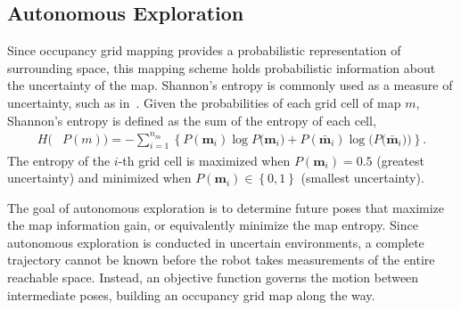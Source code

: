 \documentclass[smallextended]{svjour3}       %
\newcommand{\braces}[1]{\ensuremath{\left\{ #1 \right\}}}
\begin{document}
\subsection{Autonomous Exploration}
\label{subsec:AE}
Since occupancy grid mapping provides a probabilistic representation of surrounding space, this mapping scheme holds probabilistic information about the uncertainty of the map. Shannon's entropy is commonly used as a measure of uncertainty, such as in~\cite{StaGriBur05}. Given the probabilities of each grid cell of map $m$, Shannon's entropy is defined as the sum of the entropy of each cell,
\begin{align}
\label{eqn:ShannonsEntropyDef}
H(&P(m))=%
-\sum_{i=1}^{n_m}\braces{
P(\mathbf{m}_i)\log{P(\mathbf{m}_i})+P(\bar{\mathbf{m}}_i)\log{(P(\bar{\mathbf{m}}_i}))}.
\end{align}
The entropy of the $i$-th grid cell is maximized when $P(\mathbf{m}_i)=0.5$ (greatest uncertainty) and minimized when $P(\mathbf{m}_i)\in\braces{0,1}$ (smallest uncertainty). %

The goal of autonomous exploration is to determine future poses that maximize the map information gain, or equivalently minimize the map entropy. 
Since autonomous exploration is conducted in uncertain environments, a complete trajectory cannot be known before the robot takes measurements of the entire reachable space.
Instead, an objective function governs the motion between intermediate poses, building an occupancy grid map along the way.
\end{document}
